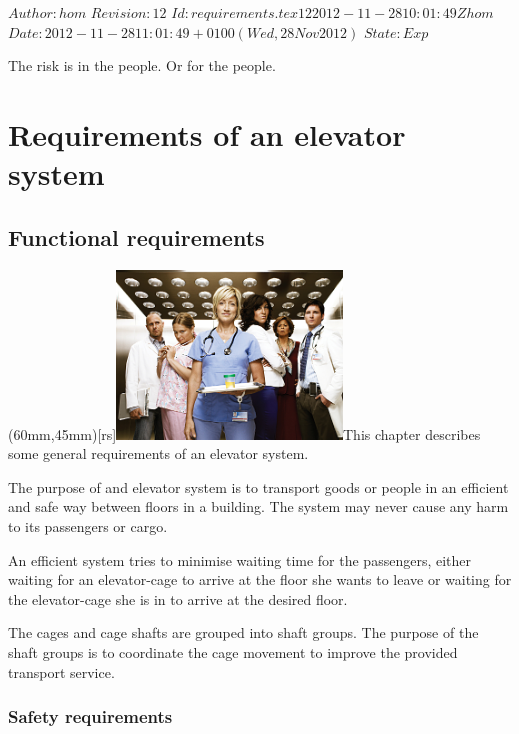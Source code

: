 \renewcommand\TheFile{requirements.tex}
\SVN $Author: hom $
\SVN $Revision: 12 $
\SVN $Id: requirements.tex 12 2012-11-28 10:01:49Z hom $
\SVN $Date: 2012-11-28 11:01:49 +0100 (Wed, 28 Nov 2012) $
\SVN $State: Exp $
\begin{savequote}[8cm]
  \sffamily
  The risk is in the people. Or for the people.
\end{savequote}

\chapter{Requirements of an elevator system}
\section{Functional requirements}
\parpic(60mm,45mm)[rs]{\includegraphics[width=60mm]{figures/nurse_jackie_gal2_pr01_elevator.jpg}}This chapter describes some general requirements of an elevator
system.
 
The purpose of and elevator system is to transport goods or people in
an efficient and safe way between floors in a building. The system
may never cause any harm to its passengers or cargo.

An efficient system tries to minimise waiting time for the passengers,
either waiting for an elevator-cage to arrive at the floor she wants
to leave or waiting for the elevator-cage she is in to arrive at the 
desired floor.

The cages and cage shafts are grouped into shaft groups. The purpose of
the shaft groups is to coordinate the cage movement to improve the
provided transport service.

\subsection{Safety requirements}

